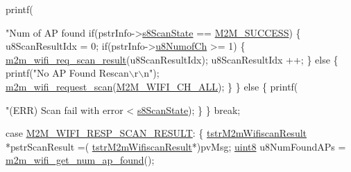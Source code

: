 \begin{DoxyCode}
            printf(\textcolor{stringliteral}{"Num of AP found %
            \textcolor{keywordflow}{if}(pstrInfo->\hyperlink{structtstrM2mScanDone_adf06f5d0db8d0fb98e7674672ee8439d}{s8ScanState} == \hyperlink{nm__common_8h_a9ef27ba27aafdd1aa3a79d3ba2c36b8f}{M2M\_SUCCESS})
            \{
                u8ScanResultIdx = 0;
                \textcolor{keywordflow}{if}(pstrInfo->\hyperlink{structtstrM2mScanDone_a1303b806dd93bfdd4b4a51ad750b023b}{u8NumofCh} >= 1)
                \{
                    \hyperlink{group__WifiReqScanResult_ga2585ee08ee8ecac67155ec99dd4d0863}{m2m\_wifi\_req\_scan\_result}(u8ScanResultIdx);
                    u8ScanResultIdx ++;
                \}
                \textcolor{keywordflow}{else}
                \{
                    printf(\textcolor{stringliteral}{"No AP Found Rescan\(\backslash\)r\(\backslash\)n"});
                    \hyperlink{group__WifiRequestScanFn_ga499dfa24a19c2e84776aeabedf897135}{m2m\_wifi\_request\_scan}(\hyperlink{group__WlanEnums_gga2a91dd671e2672dba1a7ed45230f3a99a9ab262cc4f83b59a0710ffb80134c637}{M2M\_WIFI\_CH\_ALL});
                \}
            \}
            \textcolor{keywordflow}{else}
            \{
                printf(\textcolor{stringliteral}{"(ERR) Scan fail with error <%
      \hyperlink{structtstrM2mScanDone_adf06f5d0db8d0fb98e7674672ee8439d}{s8ScanState});
            \}
        \}
        \textcolor{keywordflow}{break};
    
    \textcolor{keywordflow}{case} \hyperlink{group__WlanEnums_gga064de09dec1d5e88ed8d075fa40f57deadfb48e88c3a8e5f9dac634d62d3f53e5}{M2M\_WIFI\_RESP\_SCAN\_RESULT}:
        \{
            \hyperlink{structtstrM2mWifiscanResult}{tstrM2mWifiscanResult}       *pstrScanResult =(
      \hyperlink{structtstrM2mWifiscanResult}{tstrM2mWifiscanResult}*)pvMsg;
            \hyperlink{group__DataT_ga4df709a77647e870bbf1d955b8edc9a6}{uint8}                       u8NumFoundAPs = 
      \hyperlink{group__WifiGetNumAPFoundFn_gac92223273822358f4aee6e133b11815d}{m2m\_wifi\_get\_num\_ap\_found}();
            
}}
\end{DoxyCode}
